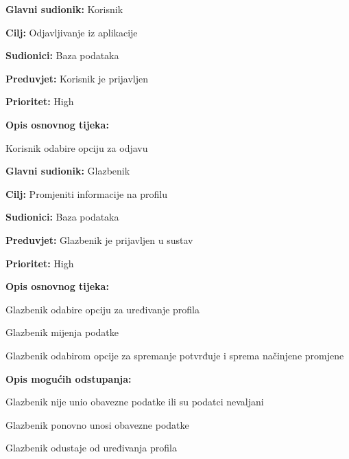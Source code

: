 \noindent {}
	\begin{packed_item}
	   	
	   	\item \textbf{Glavni sudionik: } Korisnik
	   	\item \textbf{Cilj:} Odjavljivanje iz aplikacije
	   	\item \textbf{Sudionici:} Baza podataka
	   	\item \textbf{Preduvjet:} Korisnik je prijavljen
	   	\item \textbf{Prioritet:} High
	   	\item \textbf{Opis osnovnog tijeka:} 
	   	
	   	\item[] \begin{packed_enum}
	   		
	   		\item Korisnik odabire opciju za odjavu
	   		
	   	\end{packed_enum}
	\end{packed_item}	 

\noindent {}
	\begin{packed_item}
		
		\item \textbf{Glavni sudionik:} Glazbenik
		\item \textbf{Cilj:} Promjeniti informacije na profilu
		\item \textbf{Sudionici:} Baza podataka
		\item \textbf{Preduvjet:} Glazbenik je prijavljen u sustav
		\item \textbf{Prioritet:} High
		\item \textbf{Opis osnovnog tijeka:}
		
		\item[] \begin{packed_enum}
			\item Glazbenik odabire opciju za uređivanje profila 
			\item Glazbenik mijenja podatke
			\item Glazbenik odabirom opcije za spremanje potvrđuje i sprema načinjene promjene
		\end{packed_enum}
	
		\item  \textbf{Opis mogućih odstupanja:}
		\item[] \begin{packed_item}
			
			\item[3.a] Glazbenik nije unio obavezne podatke ili su podatci nevaljani
			\item[] \begin{packed_enum}
				
				\item Glazbenik ponovno unosi obavezne podatke
				\item Glazbenik odustaje od uređivanja profila
				
			\end{packed_enum}	
		\end{packed_item}
	\end{packed_item}
	
